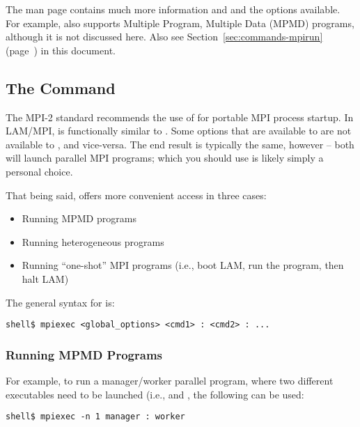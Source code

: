The  man page contains much more information and
 and the options available.  For example, 
also supports Multiple Program, Multiple Data (MPMD) programs,
although it is not discussed here.  Also see
Section~\ref{sec:commands-mpirun} (page~\pageref{sec:commands-mpirun})
in this document.


\subsection{The  Command}

The MPI-2 standard recommends the use of  for portable
MPI process startup.  In LAM/MPI,  is functionally similar
to .  Some options that are available to  are
not available to , and vice-versa.  The end result is
typically the same, however -- both will launch parallel MPI programs;
which you should use is likely simply a personal choice.

That being said,  offers more convenient access in three
cases:

\begin{itemize}
\item Running MPMD programs
\item Running heterogeneous programs
\item Running ``one-shot'' MPI programs (i.e., boot LAM, run the
  program, then halt LAM)
\end{itemize}

The general syntax for  is:

\lstset{style=lam-cmdline}
\begin{lstlisting}
shell$ mpiexec <global_options> <cmd1> : <cmd2> : ...
\end{lstlisting}


\subsubsection{Running MPMD Programs}

For example, to run a manager/worker parallel program, where two
different executables need to be launched (i.e.,  and
, the following can be used:

\lstset{style=lam-cmdline}
\begin{lstlisting}
shell$ mpiexec -n 1 manager : worker
\end{lstlisting}

